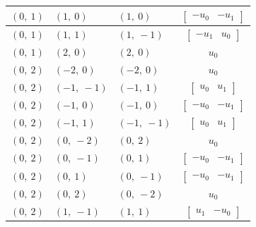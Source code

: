 \documentclass[11pt]{article}
\theoremstyle{definition}
\begin{document}
\begin{longtable}{|l|l|l|c|}
    \hline
    $\left( 0, \  1\right)$ & $\left( 1, \  0\right)$ & $\left( 1, \  0\right)$ & $\left[\begin{matrix}- u_{0} & - u_{1}\end{matrix}\right]$ \\
    \hline
    $\left( 0, \  1\right)$ & $\left( 1, \  1\right)$ & $\left( 1, \  -1\right)$ & $\left[\begin{matrix}- u_{1} & u_{0}\end{matrix}\right]$ \\
    \hline
    $\left( 0, \  1\right)$ & $\left( 2, \  0\right)$ & $\left( 2, \  0\right)$ & $u_{0}$ \\
    \hline
    $\left( 0, \  2\right)$ & $\left( -2, \  0\right)$ & $\left( -2, \  0\right)$ & $u_{0}$ \\
    \hline
    $\left( 0, \  2\right)$ & $\left( -1, \  -1\right)$ & $\left( -1, \  1\right)$ & $\left[\begin{matrix}u_{0} & u_{1}\end{matrix}\right]$ \\
    \hline
    $\left( 0, \  2\right)$ & $\left( -1, \  0\right)$ & $\left( -1, \  0\right)$ & $\left[\begin{matrix}- u_{0} & - u_{1}\end{matrix}\right]$ \\
    \hline
    $\left( 0, \  2\right)$ & $\left( -1, \  1\right)$ & $\left( -1, \  -1\right)$ & $\left[\begin{matrix}u_{0} & u_{1}\end{matrix}\right]$ \\
    \hline
    $\left( 0, \  2\right)$ & $\left( 0, \  -2\right)$ & $\left( 0, \  2\right)$ & $u_{0}$ \\
    \hline
    $\left( 0, \  2\right)$ & $\left( 0, \  -1\right)$ & $\left( 0, \  1\right)$ & $\left[\begin{matrix}- u_{0} & - u_{1}\end{matrix}\right]$ \\
    \hline
    $\left( 0, \  2\right)$ & $\left( 0, \  1\right)$ & $\left( 0, \  -1\right)$ & $\left[\begin{matrix}- u_{0} & - u_{1}\end{matrix}\right]$ \\
    \hline
    $\left( 0, \  2\right)$ & $\left( 0, \  2\right)$ & $\left( 0, \  -2\right)$ & $u_{0}$ \\
    \hline
    $\left( 0, \  2\right)$ & $\left( 1, \  -1\right)$ & $\left( 1, \  1\right)$ & $\left[\begin{matrix}u_{1} & - u_{0}\end{matrix}\right]$ \\

\end{longtable}
\end{document}
